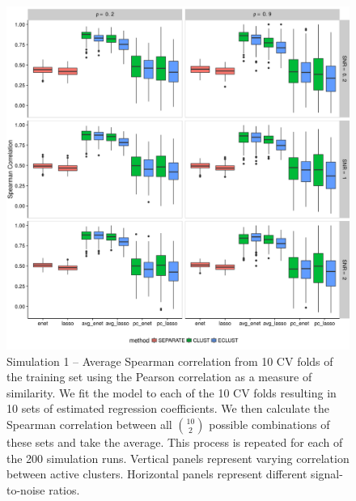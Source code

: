 \begin{figure}[H]
	\centering
	\includegraphics[scale=0.6, keepaspectratio]{./figs/hydra/results/figures/sim1-sept10/spearman_Correlation_sim1.png}
	\caption{Simulation 1 -- Average Spearman correlation from 10 CV folds of the training set using the Pearson correlation as a measure of similarity. We fit the model to each of the 10 CV folds resulting in 10 sets of estimated regression coefficients. We then calculate the Spearman correlation between all $\binom{10}{2}$ possible combinations of these sets and take the average. This process is repeated for each of the 200 simulation runs. Vertical panels represent varying correlation between active clusters. Horizontal panels represent different signal-to-noise ratios.}
	\label{fig:spearman_Correlation_sim1}
\end{figure}


